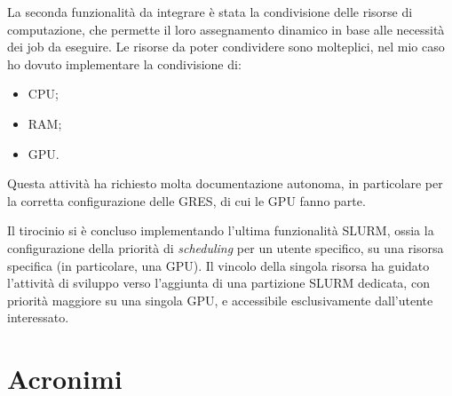 \documentclass[12pt,a4paper,twoside,openright]{book}
\begin{document}
La seconda funzionalità da integrare è stata la condivisione delle risorse di computazione, che permette il loro assegnamento dinamico in base alle necessità dei job da eseguire. Le risorse da poter condividere sono molteplici, nel mio caso ho dovuto implementare la condivisione di:
\begin{itemize}
    \item \acf{CPU};
    \item \acf{RAM};
    \item \acf{GPU}.
\end{itemize}
Questa attività ha richiesto molta documentazione autonoma, in particolare per la corretta configurazione delle \acf{GRES}, di cui le \ac{GPU} fanno parte.

Il tirocinio si è concluso implementando l'ultima funzionalità \ac{SLURM}, ossia la configurazione della priorità di \textit{scheduling} per un utente specifico, su una risorsa specifica (in particolare, una \ac{GPU}). Il vincolo della singola risorsa ha guidato l'attività di sviluppo verso l'aggiunta di una partizione \ac{SLURM} dedicata, con priorità maggiore su una singola \ac{GPU}, e accessibile esclusivamente dall'utente interessato.


\chapter*{Acronimi} %
\pagestyle{plain}
\begin{acronym}
\end{acronym}
\end{document}
